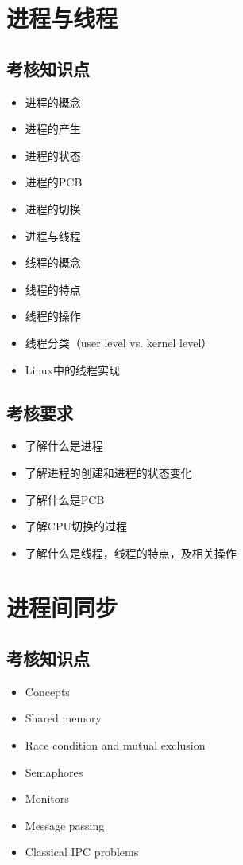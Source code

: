 \documentclass[11pt]{article}
\begin{document}
\section{进程与线程}
\label{sec-2}
\subsection{考核知识点}
\label{sec-2-1}
\begin{itemize}
\item 进程的概念
\item 进程的产生
\item 进程的状态
\item 进程的PCB
\item 进程的切换
\item 进程与线程
\item 线程的概念
\item 线程的特点
\item 线程的操作
\item 线程分类（user level vs. kernel level）
\item Linux中的线程实现
\end{itemize}
\subsection{考核要求}
\label{sec-2-2}
\begin{itemize}
\item 了解什么是进程
\item 了解进程的创建和进程的状态变化
\item 了解什么是PCB
\item 了解CPU切换的过程
\item 了解什么是线程，线程的特点，及相关操作
\end{itemize}
\section{进程间同步}
\label{sec-3}
\subsection{考核知识点}
\label{sec-3-1}
\begin{itemize}
\item Concepts
\item Shared memory
\item Race condition and mutual exclusion
\item Semaphores
\item Monitors
\item Message passing
\item Classical IPC problems
\end{itemize}
\end{document}
